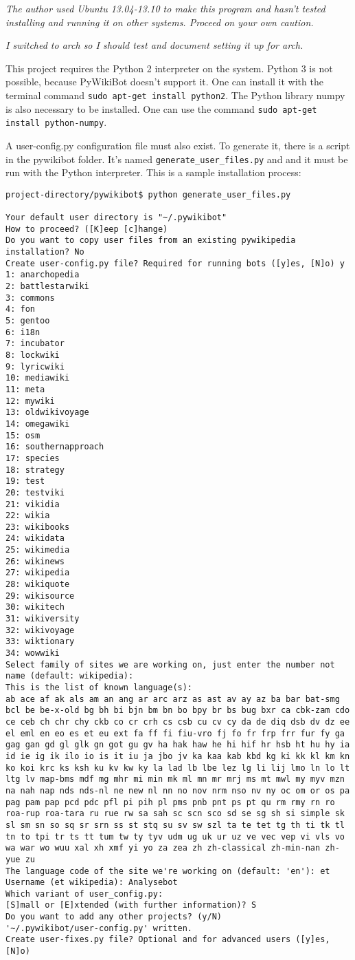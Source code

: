 \emph{The author used Ubuntu 13.04-13.10 to make this program and hasn't tested installing and running it on other systems. Proceed on your own caution.}

\emph{I switched to arch so I should test and document setting it up for arch.}

This project requires the Python 2 interpreter on the system. Python 3 is not possible, because PyWikiBot doesn't support it. One can install it with the terminal command \verb;sudo apt-get install python2;. The Python library numpy is also necessary to be installed. One can use the command \verb;sudo apt-get install python-numpy;.

A user-config.py configuration file must also exist. To generate it, there is a script in the pywikibot folder. It's named \verb;generate_user_files.py; and and it must be run with the Python interpreter. This is a sample installation process:
\begin{verbatim}
project-directory/pywikibot$ python generate_user_files.py

Your default user directory is "~/.pywikibot" 
How to proceed? ([K]eep [c]hange) 
Do you want to copy user files from an existing pywikipedia installation? No 
Create user-config.py file? Required for running bots ([y]es, [N]o) y 
1: anarchopedia 
2: battlestarwiki 
3: commons 
4: fon 
5: gentoo 
6: i18n 
7: incubator 
8: lockwiki 
9: lyricwiki 
10: mediawiki 
11: meta 
12: mywiki 
13: oldwikivoyage 
14: omegawiki 
15: osm 
16: southernapproach 
17: species 
18: strategy 
19: test 
20: testviki 
21: vikidia 
22: wikia 
23: wikibooks 
24: wikidata 
25: wikimedia 
26: wikinews 
27: wikipedia 
28: wikiquote 
29: wikisource 
30: wikitech 
31: wikiversity 
32: wikivoyage 
33: wiktionary 
34: wowwiki 
Select family of sites we are working on, just enter the number not name (default: wikipedia): 
This is the list of known language(s): 
ab ace af ak als am an ang ar arc arz as ast av ay az ba bar bat-smg bcl be be-x-old bg bh bi bjn bm bn bo bpy br bs bug bxr ca cbk-zam cdo ce ceb ch chr chy ckb co cr crh cs csb cu cv cy da de diq dsb dv dz ee el eml en eo es et eu ext fa ff fi fiu-vro fj fo fr frp frr fur fy ga gag gan gd gl glk gn got gu gv ha hak haw he hi hif hr hsb ht hu hy ia id ie ig ik ilo io is it iu ja jbo jv ka kaa kab kbd kg ki kk kl km kn ko koi krc ks ksh ku kv kw ky la lad lb lbe lez lg li lij lmo ln lo lt ltg lv map-bms mdf mg mhr mi min mk ml mn mr mrj ms mt mwl my myv mzn na nah nap nds nds-nl ne new nl nn no nov nrm nso nv ny oc om or os pa pag pam pap pcd pdc pfl pi pih pl pms pnb pnt ps pt qu rm rmy rn ro roa-rup roa-tara ru rue rw sa sah sc scn sco sd se sg sh si simple sk sl sm sn so sq sr srn ss st stq su sv sw szl ta te tet tg th ti tk tl tn to tpi tr ts tt tum tw ty tyv udm ug uk ur uz ve vec vep vi vls vo wa war wo wuu xal xh xmf yi yo za zea zh zh-classical zh-min-nan zh-yue zu 
The language code of the site we're working on (default: 'en'): et 
Username (et wikipedia): Analysebot 
Which variant of user_config.py: 
[S]mall or [E]xtended (with further information)? S 
Do you want to add any other projects? (y/N) 
'~/.pywikibot/user-config.py' written. 
Create user-fixes.py file? Optional and for advanced users ([y]es, [N]o)
\end{verbatim}

